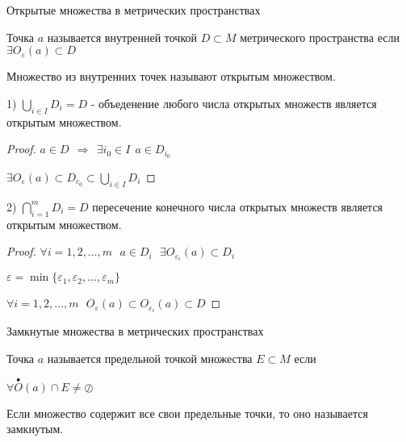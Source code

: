 \begin{title}[\Large]
  Открытые множества в метрических пространствах
\end{title}

\begin{define}
  Точка $a$ называется внутренней точкой $D \subset M$ метрического
  пространства если  $\exists O_{\varepsilon}(a) \subset D$
\end{define}

\begin{define}
  Множество из внутренних точек называют открытым множеством.
\end{define}

\begin{block}[Свойства]
  1) $\bigcup_{i \in I} D_i = D$ - объеденение любого числа открытых множеств
  является открытым множеством.

  \begin{proof}
    $a \in D ~~ \Rightarrow ~~ \exists i_0 \in I ~~ a \in D_{i_0}$

    $\exists O_{\varepsilon}(a) \subset D_{c_0} \subset \bigcup_{i \in I} D_i$
  \end{proof}

  2) $\bigcap_{i=1}^m D_i = D$ пересечение конечного числа открытых
  множеств является открытым множеством.

  \begin{proof}
    $\forall i = 1, 2, \ldots, m ~~~ a \in D_i ~~~
    \exists O_{\varepsilon_i}(a) \subset D_i$

    $\varepsilon = \min \{\varepsilon_1, \varepsilon_2, \ldots, \varepsilon_m\}$

    $\forall i = 1, 2, \ldots, m ~~~
    O_{\varepsilon}(a) \subset O_{\varepsilon_i}(a) \subset D$
  \end{proof}
\end{block}

\begin{title}[\Large]
  Замкнутые множества в метрических пространствах
\end{title}

\begin{define}
  Точка $a$ называется предельной точкой множества $E \subset M$ если

  $\forall \stackrel{\bullet}{O}(a) \cap E \not= \oslash$
\end{define}

\begin{define}
  Если множество содержит все свои предельные точки, то оно называется
  замкнутым.
\end{define}

